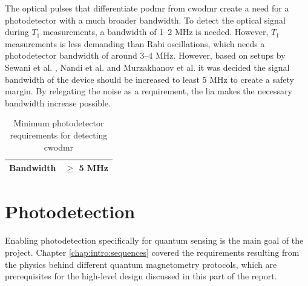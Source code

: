 The optical pulses that differentiate \gls{podmr} from \gls{cwodmr} create a need for a photodetector with a much broader bandwidth. To detect the optical signal during $T_1$ measurements, a bandwidth of \numrange[]{1}{2} \unit{\mega\hertz} is needed. However, $T_1$ measurements is less demanding than Rabi oscillations, which needs a photodetector bandwidth of around \numrange[]{3}{4} \unit{\mega\hertz}.  However, based on setups by Sewani et al. \cite{sewani2020coherent}, Nandi et al. \cite{nandi2024oscilloscope} and Murzakhanov et al. \cite{murzakhanov2025mechanism} it was decided the signal bandwidth of the device should be increased to least 5 \unit{\mega\hertz} to create a safety margin. By relegating the noise as a requirement, the \gls{lia} makes the necessary bandwidth increase possible. 

\begin{table}[!ht]
	\centering
	\begin{tabular}{|c|c|}
		\hline
		Bandwidth 	&  $\geq$ 5 \unit[]{\mega\hertz}					\\
		\hline
	\end{tabular}
	\caption{Minimum photodetector requirements for detecting \gls{cwodmr}}
	\label{tab:fd:podmr}
\end{table}




\section{Photodetection}
Enabling photodetection specifically for quantum sensing is the main goal of the project. Chapter \ref{chap:intro:sequences} covered the requirements resulting from the physics behind different quantum magnetometry protocols, which are prerequisites for the high-level design discussed in this part of the report. 

